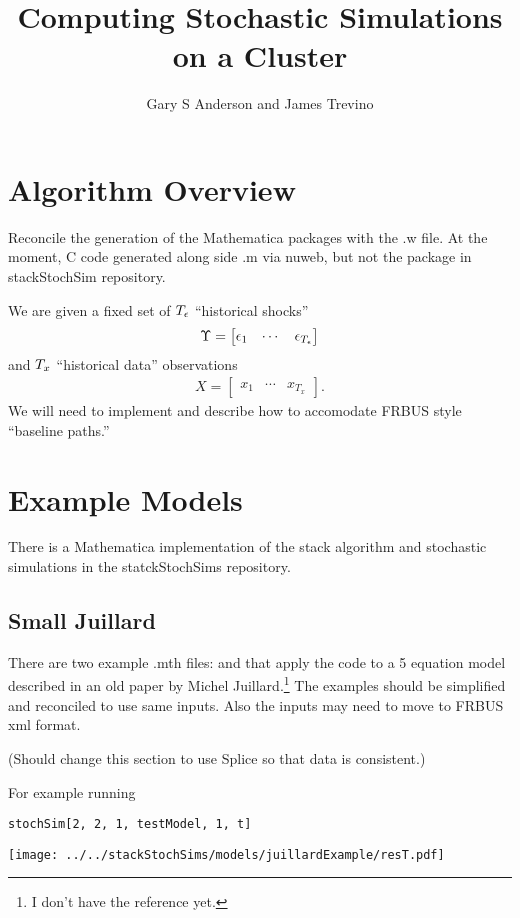 \documentclass[12pt]{article}
\title{Computing Stochastic Simulations on a Cluster}
\author{Gary S Anderson and James Trevino}
\begin{document}
\maketitle
\section{Algorithm Overview}
\label{sec:algorithm-overview}

Reconcile the generation of the Mathematica packages with the .w file. At the moment, C code generated along side .m via nuweb, but not the package in stackStochSim repository.

We are given a fixed set of ${T_\epsilon}$ ``historical shocks''
\begin{gather*}
  \Upsilon =
  \begin{bmatrix}
    \epsilon_1&\cdots&\epsilon_{{T_\epsilon}}
  \end{bmatrix}
\end{gather*}
and ${T_x}$ ``historical data'' observations
\begin{gather*}
  X =
  \begin{bmatrix}
    x_1&\cdots&x_{T_x}
  \end{bmatrix}.
\end{gather*}
We will need to implement and describe how to accomodate FRBUS style ``baseline paths.''
\section{Example Models}
\label{sec:example-models}

There is a Mathematica implementation of the stack algorithm
 and stochastic simulations in the statckStochSims repository.  



\subsection{Small Juillard}
\label{sec:small-juillard}
There are two example .mth files:  and  that apply the code to a 5 equation model described in an old paper by
Michel Juillard.\footnote{I don't have the reference yet.} The examples should
be simplified and reconciled to use same inputs.  Also the inputs may need
to move to FRBUS xml format.

(Should change this section to use Splice so that data is consistent.)

For example running
\begin{verbatim}
stochSim[2, 2, 1, testModel, 1, t]
\end{verbatim}
\texttt{[image: ../../stackStochSims/models/juillardExample/resT.pdf]}
\end{document}
